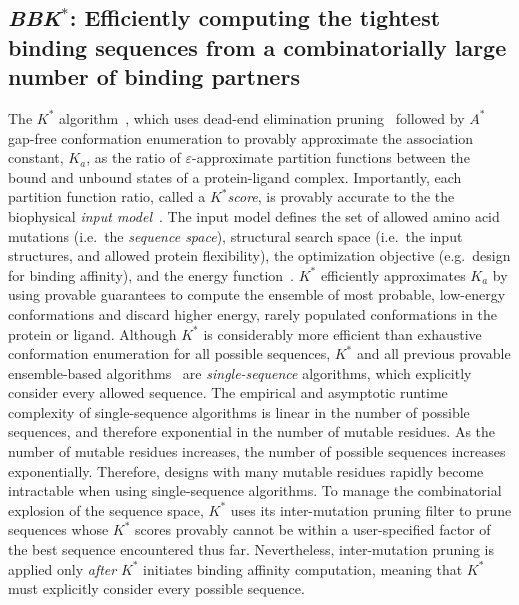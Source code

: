 \def\as{\textit{$A^*$}\xspace}
\def\ks{\textit{$K^*$}\xspace}
\def\ka{\textit{$K_a$}\xspace}
\def\bbks{\textit{BBK$^*$}\xspace}
\def\multisequencebound{MS\xspace}
\def\msbound{\multisequencebound}

\subsection{\bbks: Efficiently computing the tightest binding sequences from a combinatorially large number of binding partners}

The \ks algorithm~\cite{}, which uses dead-end elimination pruning~\cite{} followed by \as~\cite{} gap-free conformation enumeration to provably approximate the association constant, \ka, as the ratio of $\varepsilon$-approximate partition functions between the bound and unbound states of a protein-ligand complex. Importantly, each partition function ratio, called a \ks \emph{score}, is provably accurate to the the biophysical \emph{input model}~\cite{}. The input model defines the set of allowed amino acid mutations (i.e.~the \emph{sequence space}), structural search space (i.e.~the input structures, and allowed protein flexibility), the optimization objective (e.g.~design for binding affinity), and the energy function~\cite{}. \ks efficiently approximates \ka by using provable guarantees to compute the ensemble of most probable, low-energy conformations and discard higher energy, rarely populated conformations in the protein or ligand. Although \ks is considerably more efficient than exhaustive conformation enumeration for all possible sequences, \ks and all previous provable ensemble-based algorithms~\cite{} are \emph{single-sequence} algorithms, which explicitly consider every allowed sequence. The empirical and asymptotic runtime complexity of single-sequence algorithms is linear in the number of possible sequences, and therefore exponential in the number of mutable residues. As the number of mutable residues increases, the number of possible sequences increases exponentially. Therefore, designs with many mutable residues rapidly become intractable when using single-sequence algorithms. To manage the combinatorial explosion of the sequence space, \ks uses its inter-mutation pruning filter to prune sequences whose \ks scores provably cannot be within a user-specified factor of the best sequence encountered thus far. Nevertheless, inter-mutation pruning is applied only \emph{after} \ks initiates binding affinity computation, meaning that \ks must explicitly consider every possible sequence.

